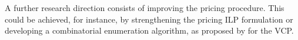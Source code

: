 \documentclass[preprint, 11pt, authoryear]{elsarticle}
\newcommand{\PP}{{\mathcal P}}
\newcommand{\QQ}{{\mathcal Q}}
\begin{document}
A further research direction consists of improving the pricing procedure. This could be achieved, for instance, by strengthening the pricing ILP formulation or developing a combinatorial enumeration algorithm, as proposed by \citet{Held2012} for the VCP.





\end{document}
